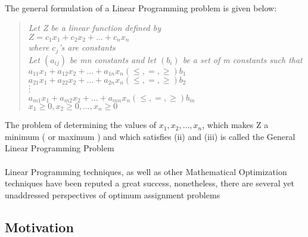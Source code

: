\documentclass{article}
\begin{document}
            \paragraph{}
                The general formulation of a Linear Programming problem is given below:
                \begin{verse}
                    \begin{center}
                        \textit{
                            Let Z be a linear function defined by \\
                            $Z = c_1x_1 + c_2x_2+...+c_nx_n$ \\
                            where $c_j$'s are constants \\
                            Let $(a_{ij})$ be mn constants and let $(b_i)$ be a set of m constants such that \\
                            $a_{11}x_1+a_{12}x_2+...+a_{1n}x_n (\leq,=,\geq) b_1$ \\
                            $a_{21}x_1+a_{22}x_2+...+a_{2n}x_n (\leq,=,\geq) b_2$ \\
                            $\cdot$ \\
                            $\cdot$ \\
                            $\cdot$ \\
                            $a_{m1}x_1+a_{m2}x_2+...+a_{mn}x_n (\leq,=,\geq) b_m$ \\
                            $x_1\geq0,x_2\geq0,...,x_n\geq0$ \\
                        }                   
                    \end{center}
                 \end{verse}
                The problem of determining the values of $x_1, x_2,...,x_n$, which makes Z a minimum ( or maximum ) and which satisfies (ii) and (iii) is called the General Linear Programming Problem    
            \paragraph{}
                Linear Programming techniques, as well as other Mathematical Optimization techniques have been reputed a great success, nonetheless, there are several yet unaddressed perspectives of optimum assignment problems
        \\
        \subsection{Motivation}
\end{document}
